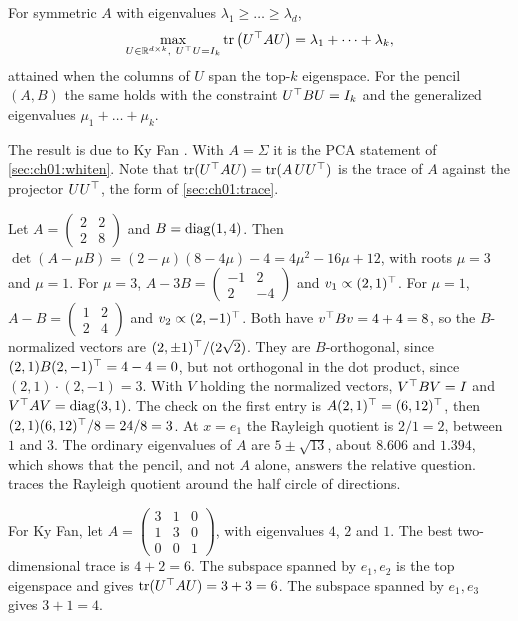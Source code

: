 \begin{theorem}\label{thm:ch01:kyfan}
For symmetric $A$ with eigenvalues $\lambda_1\ge\dots\ge\lambda_d$,
\begin{equation}\label{eq:ch01:kyfan}
\max_{U\in\mathbb{R}^{d\times k},\ U^{\top} U=I_k}\operatorname{tr}\big(U^{\top} AU\big)=\lambda_1+\dots+\lambda_k ,
\end{equation}
attained when the columns of $U$ span the top-$k$ eigenspace. For the pencil
$(A,B)$ the same holds with the constraint $U^{\top} BU=I_k$ and the generalized
eigenvalues $\mu_1+\dots+\mu_k$.
\end{theorem}

The result is due to Ky Fan \cite{fan1949}. With $A=\Sigma$ it is the PCA
statement of \cref{sec:ch01:whiten}. Note that $\operatorname{tr}(U^{\top} AU)=\operatorname{tr}(A\,UU^{\top})$ is the
trace of $A$ against the projector $UU^{\top}$, the form of \cref{sec:ch01:trace}.

\begin{example}\label{ex:ch01:pencil}
Let $A=\begin{pmatrix}2&2\\2&8\end{pmatrix}$ and $B=\operatorname{diag}(1,4)$. Then
$\det(A-\mu B)=(2-\mu)(8-4\mu)-4=4\mu^2-16\mu+12$, with roots $\mu=3$ and
$\mu=1$. For $\mu=3$, $A-3B=\begin{pmatrix}-1&2\\2&-4\end{pmatrix}$ and
$v_1\propto(2,1)^{\top}$. For $\mu=1$, $A-B=\begin{pmatrix}1&2\\2&4\end{pmatrix}$ and
$v_2\propto(2,-1)^{\top}$. Both have $v^{\top} Bv=4+4=8$, so the $B$-normalized vectors
are $(2,\pm1)^{\top}/(2\sqrt2)$. They are $B$-orthogonal, since
$(2,1)B(2,-1)^{\top}=4-4=0$, but not orthogonal in the dot product, since
$(2,1)\cdot(2,-1)=3$. With $V$ holding the normalized vectors, $V^{\top} BV=I$ and
$V^{\top} AV=\operatorname{diag}(3,1)$. The check on the first entry is $A(2,1)^{\top}=(6,12)^{\top}$,
then $(2,1)(6,12)^{\top}/8=24/8=3$. At $x=e_1$ the Rayleigh quotient is
$2/1=2$, between $1$ and $3$. The ordinary eigenvalues of $A$ are
$5\pm\sqrt{13}$, about $8.606$ and $1.394$, which shows that the pencil, and not
$A$ alone, answers the relative question.  traces the
Rayleigh quotient around the half circle of directions.

For Ky Fan, let $A=\begin{pmatrix}3&1&0\\1&3&0\\0&0&1\end{pmatrix}$, with
eigenvalues $4$, $2$ and $1$. The best two-dimensional trace is $4+2=6$. The
subspace spanned by $e_1,e_2$ is the top eigenspace and gives
$\operatorname{tr}(U^{\top} AU)=3+3=6$. The subspace spanned by $e_1,e_3$ gives $3+1=4$.
\end{example}


